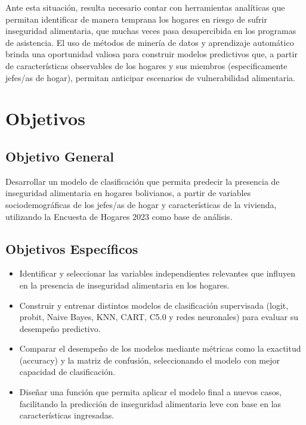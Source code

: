 \documentclass[Royal,times,sageh]{sagej}
\begin{document}
Ante esta situación, resulta necesario contar con herramientas
analíticas que permitan identificar de manera temprana los hogares en
riesgo de sufrir inseguridad alimentaria, que muchas veces pasa
desapercibida en los programas de asistencia. El uso de métodos de
minería de datos y aprendizaje automático brinda una oportunidad valiosa
para construir modelos predictivos que, a partir de características
observables de los hogares y sus miembros (especificamente jefes/as de
hogar), permitan anticipar escenarios de vulnerabilidad alimentaria.

\section{Objetivos}\label{objetivos}

\subsection{Objetivo General}\label{objetivo-general}

Desarrollar un modelo de clasificación que permita predecir la presencia
de inseguridad alimentaria en hogares bolivianos, a partir de variables
sociodemográficas de los jefes/as de hogar y características de la
vivienda, utilizando la Encuesta de Hogares 2023 como base de análisis.

\subsection{Objetivos Específicos}\label{objetivos-especuxedficos}

\begin{itemize}
\item
  Identificar y seleccionar las variables independientes relevantes que
  influyen en la presencia de inseguridad alimentaria en los hogares.
\item
  Construir y entrenar distintos modelos de clasificación supervisada
  (logit, probit, Naive Bayes, KNN, CART, C5.0 y redes neuronales) para
  evaluar su desempeño predictivo.
\item
  Comparar el desempeño de los modelos mediante métricas como la
  exactitud (accuracy) y la matriz de confusión, seleccionando el modelo
  con mejor capacidad de clasificación.
\item
  Diseñar una función que permita aplicar el modelo final a nuevos
  casos, facilitando la predicción de inseguridad alimentaria leve con
  base en las características ingresadas.
\end{itemize}
\end{document}
